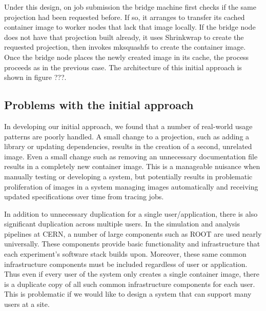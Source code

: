\documentclass[sigconf]{acmart}
\begin{document}
Under this design,
on job submission the bridge machine first checks if the same projection had been requested before.
If so, it arranges to transfer its cached container image to worker nodes that lack that image locally.
If the bridge node does not have that projection built already,
it uses Shrinkwrap to create the requested projection,
then invokes mksquashfs to create the container image.
Once the bridge node places the newly created image in its cache,
the process proceeds as in the previous case.
The architecture of this initial approach is shown in figure ???.



\subsection{Problems with the initial approach}

In developing our initial approach,
we found that a number of real-world usage patterns are poorly handled.
A small change to a projection,
such as adding a library or updating dependencies,
results in the creation of a second, unrelated image.
Even a small change such as removing an unnecessary documentation file results in a completely new container image.
This is a manageable nuisance when manually testing or developing a system,
but potentially results in problematic proliferation of images in a system managing images automatically and receiving updated specifications over time from tracing jobs.

In addition to unnecessary duplication for a single user/application,
there is also significant duplication across multiple users.
In the simulation and analysis pipelines at CERN,
a number of large components such as ROOT are used nearly universally.
These components provide basic functionality and infrastructure that each experiment's software stack builds upon.
Moreover, these same common infrastructure components must be included regardless of user or application.
Thus even if every user of the system only creates a single container image,
there is a duplicate copy of all such common infrastructure components for each user.
This is problematic if we would like to design a system that can support many users at a site.
\end{document}
